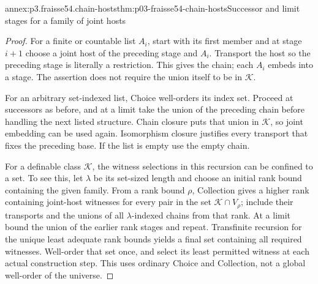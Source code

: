 \begin{annexitem}{annex:p3.fraisse54.chain-hosts}{thm:p03-fraisse54-chain-hosts}{Successor and limit stages for a family of joint hosts}
\begin{proof}
For a finite or countable list \(A_i\), start with its first member and
at stage \(i+1\) choose a joint host of the preceding stage and \(A_i\).
Transport the host so the preceding stage is literally a restriction.
This gives the chain; each \(A_i\) embeds into a stage. The assertion
does not require the union itself to be in \(\mathcal K\).

For an arbitrary set-indexed list, Choice well-orders its index set.
Proceed at successors as before, and at a limit take the union of the
preceding chain before handling the next listed structure. Chain closure
puts that union in \(\mathcal K\), so joint embedding can be used again.
Isomorphism closure justifies every transport that fixes the preceding
base. If the list is empty use the empty chain.

For a definable class \(\mathcal K\), the witness selections in this
recursion can be confined to a set. To see this, let \(\lambda\) be its
set-sized length and choose an initial rank bound containing the given
family. From a rank bound \(\rho\), Collection gives a higher rank
containing joint-host witnesses for every pair in the set
\(\mathcal K\cap V_\rho\); include their transports and the unions of
all \(\lambda\)-indexed chains from that rank. At a limit bound the
union of the earlier rank stages and repeat. Transfinite recursion for
the unique least adequate rank bounds yields a final set containing all
required witnesses. Well-order that set once, and select its least
permitted witness at each actual construction step. This uses ordinary
Choice and Collection, not a global well-order of the universe.
\end{proof}
\end{annexitem}

